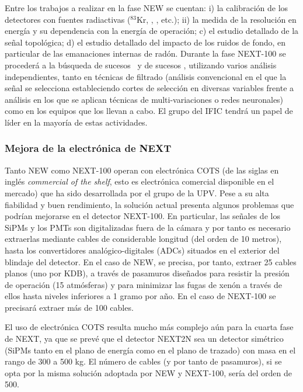 Entre los trabajos a realizar en la fase NEW se cuentan: i) la calibración de los detectores con fuentes radiactivas (\ensuremath{^{83}}Kr, \NA, \CS, etc.); ii) la medida de la resolución en energía y su dependencia con la energía de operación; c) el estudio detallado de la señal topológica; d) el estudio detallado del impacto de los ruidos de fondo, en particular de las emanaciones internas de radón. Durante la fase NEXT-100 se procederá a la búsqueda de sucesos \bb\ y de sucesos \bbonu, utilizando varios análisis independientes, tanto en técnicas de filtrado (análisis convencional en el que la señal se selecciona estableciendo cortes de selección en diversas variables frente a análisis en los que se aplican técnicas de multi-variaciones o redes neuronales) como en los equipos que los llevan a cabo. El grupo del IFIC tendrá un papel de líder en la mayoría de estas actividades. 
 
\subsubsection*{Mejora de la electrónica de NEXT}

Tanto NEW como NEXT-100 operan con electrónica COTS
(de las siglas en inglés {\em commercial of the shelf}, esto es electrónica comercial disponible en el mercado) que ha sido desarrollada por el grupo de la UPV. Pese a su alta fiabilidad y buen rendimiento, la solución actual presenta algunos problemas que podrían mejorarse en el detector NEXT-100. En particular, las señales de los SiPMs y los PMTs son digitalizadas fuera de la cámara y por tanto es necesario extraerlas mediante cables de considerable longitud (del orden de 10 metros), hasta los convertidores analógico-digitales (ADCs) situados en el exterior del blindaje del detector. En el caso de NEW, se precisa, por tanto, extraer 25 cables planos (uno por KDB), a través de pasamuros diseñados para resistir la presión de operación (15 atmósferas) y para minimizar las fugas de xenón a través de ellos hasta niveles inferiores a 1 gramo por año. En el caso de NEXT-100 se precisará extraer más de 100 cables. 

El uso de electrónica COTS resulta mucho más complejo aún para la cuarta fase de NEXT, ya que se prevé que el detector NEXT2N sea un detector simétrico (SiPMs tanto en el plano de energía como en el plano de trazado) con masa en el rango de 300 a 500 kg. El número  de cables (y por tanto de pasamuros), si se opta por la misma solución adoptada por NEW y NEXT-100, sería del orden de 500. 


